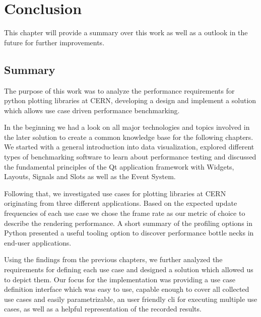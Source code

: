 

\chapter{Conclusion}
\label{ch:conclusion}

This chapter will provide a summary over this work as well as a outlook in the
future for further improvements.

\section{Summary}
\label{sec:Conclusion:Summary}

The purpose of this work was to analyze the performance requirements for python
plotting libraries at CERN, developing a design and implement a solution which
allows use case driven performance benchmarking.

In the beginning we had a look on all major technologies and topics involved in
the later solution to create a common knowledge base for the following chapters.
We started with a general introduction into data visualization, explored
different types of benchmarking software to learn about performance testing and
discussed the fundamental principles of the Qt application framework with
Widgets, Layouts, Signals and Slots as well as the Event System.

Following that, we investigated use cases for plotting libraries at CERN
originating from three different applications. Based on the expected update
frequencies of each use case we chose the frame rate as our metric of choice to
describe the rendering performance. A short summary of the profiling options in
Python presented a useful tooling option to discover performance bottle necks in
end-user applications.

Using the findings from the previous chapters, we further analyzed the
requirements for defining each use case and designed a solution which allowed us
to depict them. Our focus for the implementation was providing a use case
definition interface which was easy to use, capable enough to cover all
collected use cases and easily parametrizable, an user friendly \gls{cli} for
executing multiple use cases, as well as a helpful representation of the
recorded results.

